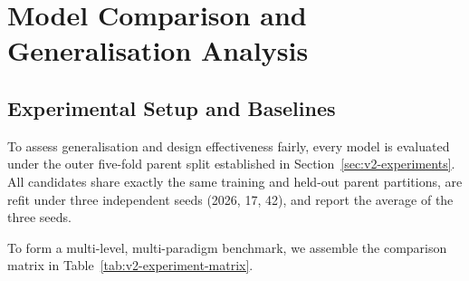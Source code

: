 \section{Model Comparison and Generalisation Analysis}

\subsection{Experimental Setup and Baselines}

To assess generalisation and design effectiveness fairly, every model is evaluated under the outer five-fold parent split established in Section~\ref{sec:v2-experiments}. All candidates share exactly the same training and held-out parent partitions, are refit under three independent seeds (2026, 17, 42), and report the average of the three seeds.

To form a multi-level, multi-paradigm benchmark, we assemble the comparison matrix in Table~\ref{tab:v2-experiment-matrix}.


